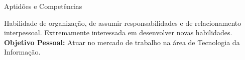 \begin{rubric}{Aptidões e Competências}{

  \entry* Habilidade de organização, de assumir responsabilidades e de
  relacionamento interpessoal. Extremamente interessada em desenvolver
  novas habilidades.
  \entry* \textbf{Objetivo Pessoal:} Atuar no mercado de trabalho na
  área de Tecnologia da Informação.
}
\end{rubric}
